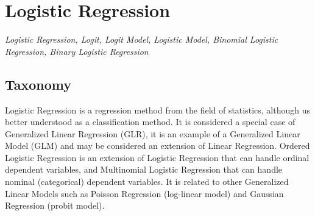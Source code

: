 
\section{Logistic Regression} 
\label{sec:logistic}

\emph{Logistic Regression, Logit, Logit Model, Logistic Model, Binomial Logistic Regression, Binary Logistic Regression}

\subsection{Taxonomy}
Logistic Regression is a regression method from the field of statistics, although us better understood as a classification method. It is considered a special case of Generalized Linear Regression (GLR), it is an example of a Generalized Linear Model (GLM) and may be considered an extension of Linear Regression.
Ordered Logistic Regression is an extension of Logistic Regression that can handle ordinal dependent variables, and Multinomial Logistic Regression that can handle nominal (categorical) dependent variables.
It is related to other Generalized Linear Models such as Poisson Regression (log-linear model) and Gaussian Regression (probit model).

